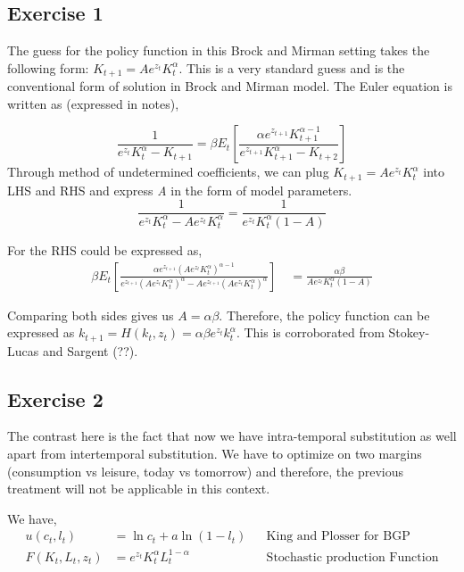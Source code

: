 \documentclass[12pt]{article}
\begin{document}
\subsection*{Exercise 1}
The guess for the policy function in this Brock and Mirman setting takes the following form: $K_{t+1} = A e^{z_t} K_t^{\alpha}$. This is a very standard guess and is the conventional form of solution in Brock and Mirman model. The Euler equation is written as (expressed in notes),

\begin{equation}
\frac{1}{e^{z_t}K_t^{\alpha} - K_{t+1}} = \beta E_t \left[ \frac{\alpha e^{z_{t +1}} K_{t+1}^{\alpha -1}}{ e^{z_{t +1}} K_{t+1}^{\alpha} - K_{t+2}}  \right]
\end{equation}
Through method of undetermined coefficients, we can plug $K_{t+1} = A e^{z_t} K_t^{\alpha}$ into LHS and RHS and express \textit{A} in the form of model parameters. 
\begin{equation}
 \frac{1}{e^{z_t}K_t^{\alpha} - A e^{z_t} K_t^{\alpha}} = \frac{1}{e^{z_t} K_t^{\alpha} (1 - A)}
\end{equation}

For the RHS could be expressed as,
\begin{align}
\beta E_t [ \frac{\alpha e^{z_{t +1}} (A e^{z_t} K_t^{\alpha})^{\alpha -1}}{ e^{z_{t +1}} (A e^{z_t} K_t^{\alpha})^{\alpha} - Ae^{z_{t+1}} (Ae^{z_t} K_t^{\alpha})^{\alpha}}]\
&= \frac{\alpha \beta}{Ae^{z_t}K_t^{\alpha}(1-A)}
\end{align}

Comparing both sides gives us $A = \alpha \beta$. Therefore, the policy function can be expressed as  $k_{t+1} = H(k_t, z_t) = \alpha \beta e^{z_t} k_t^{\alpha}$.
This is corroborated from Stokey-Lucas and Sargent (??).

\subsection*{Exercise 2}

The contrast here is the fact that now we have intra-temporal substitution as well apart from intertemporal substitution. We have to optimize on two margins (consumption vs leisure, today vs tomorrow)  and therefore, the previous treatment will not be applicable in this context.

We have,
\begin{align}
u(c_t, l_t) &= \ln c_t+ a \ln(1 - l_t) && \text{King and Plosser for BGP }\\
F(K_t, L_t, z_t) &= e^{z_t} K_t^{\alpha}L_t^{1-\alpha} && \text{Stochastic production Function}
\end{align}\\
\end{document}
